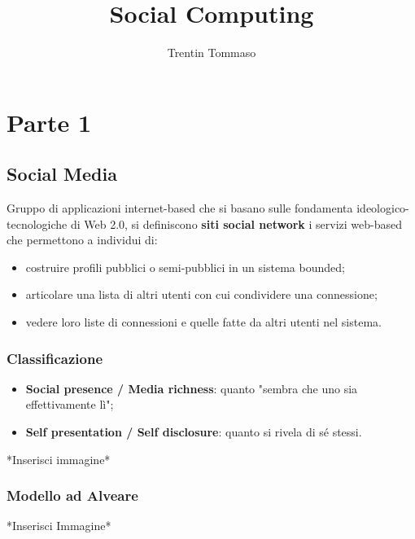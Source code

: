 \documentclass{article}
\title{Social Computing}
\author{Trentin Tommaso}
\begin{document}
  \section{Parte 1}
    \subsection{Social Media}
      Gruppo di applicazioni internet-based che si basano sulle fondamenta ideologico-tecnologiche di Web 2.0, si definiscono \textbf{siti social network} i servizi web-based che permettono a individui di:
      \begin{itemize}
        \item costruire profili pubblici o semi-pubblici in un sistema bounded; 
        \item articolare una lista di altri utenti con cui condividere una connessione;
        \item vedere loro liste di connessioni e quelle fatte da altri utenti nel sistema.
      \end{itemize}
      \subsubsection{Classificazione}
        \begin{itemize}
          \item \textbf{Social presence / Media richness}: quanto "sembra che uno sia effettivamente lì"; 
          \item \textbf{Self presentation / Self disclosure}: quanto si rivela di sé stessi.
        \end{itemize}
        *Inserisci immagine*
      \subsubsection{Modello ad Alveare}
        *Inserisci Immagine*
\end{document}
